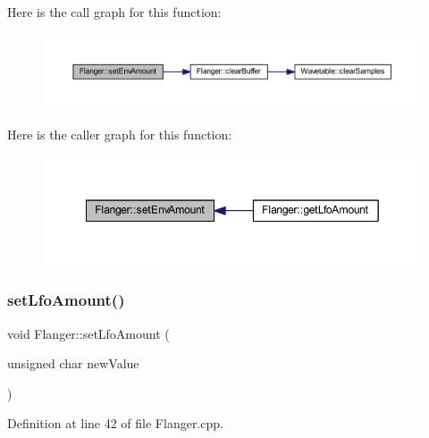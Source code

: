 Here is the call graph for this function\+:
\nopagebreak
\begin{figure}[H]
\begin{center}
\leavevmode
\includegraphics[width=350pt]{class_flanger_ac4f38ebccacae85c724fe43f13caf636_cgraph}
\end{center}
\end{figure}
Here is the caller graph for this function\+:
\nopagebreak
\begin{figure}[H]
\begin{center}
\leavevmode
\includegraphics[width=349pt]{class_flanger_ac4f38ebccacae85c724fe43f13caf636_icgraph}
\end{center}
\end{figure}
\mbox{\label{class_flanger_a311ea2020c379266da75e57bec0cc5ad}} 
\subsubsection{\texorpdfstring{set\+Lfo\+Amount()}{setLfoAmount()}}
{\footnotesize\ttfamily void Flanger\+::set\+Lfo\+Amount (\begin{DoxyParamCaption}\item[{unsigned char}]{new\+Value }\end{DoxyParamCaption})}



Definition at line 42 of file Flanger.\+cpp.

